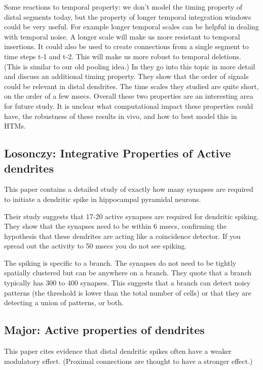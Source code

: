 \documentclass{article} %
\begin{document}
Some reactions to temporal property: we don't model the timing property of
distal segments today, but the property of longer temporal integration windows
could be very useful. For example longer temporal scales can be helpful in
dealing with temporal noise. A longer scale will make us more resistant to
temporal insertions. It could also be used to create connections from a single
segment to time steps t-1 and t-2. This will make us more robust to temporal
deletions. (This is similar to our old pooling idea.)  In \cite{Branco2010a}
they go into this topic in more detail and discuss an additional timing
property. They show that the order of signals could be relevant in distal
dendrites. The time scales they studied are quite short, on the order of a few
msecs. Overall these two properties are an interesting area for future study. It
is unclear what computational impact these properties could have, the robustness
of these results in vivo, and how to best model this in HTMs.

\subsection{Losonczy: Integrative Properties of Active dendrites}

This paper \cite{Losonczy2006} contains a detailed study of exactly how many
synapses are required to initiate a dendritic spike in hippocampal pyramidal
neurons.

Their study suggests that 17-20 active synapses are required for
dendritic spiking. They show that the synapses need to be within 6 msecs,
confirming the hypothesis that these dendrites are acting like a coincidence
detector.  If you spread out the activity to 50 msecs you do not see spiking.

The spiking is specific to a branch. The synapses do not need to be
tightly spatially clustered but can be anywhere on a branch. They quote that
a branch typically has 300 to 400 synapses. This suggests that a branch can
detect noisy patterns (the threshold is lower than the total number of cells)
or that they are detecting a union of patterns, or both.

\subsection{Major: Active properties of dendrites}

This paper \cite{Major2013} cites evidence that distal dendritic spikes often
have a weaker modulatory effect. (Proximal connections are thought to have a
stronger effect.)
\end{document}
